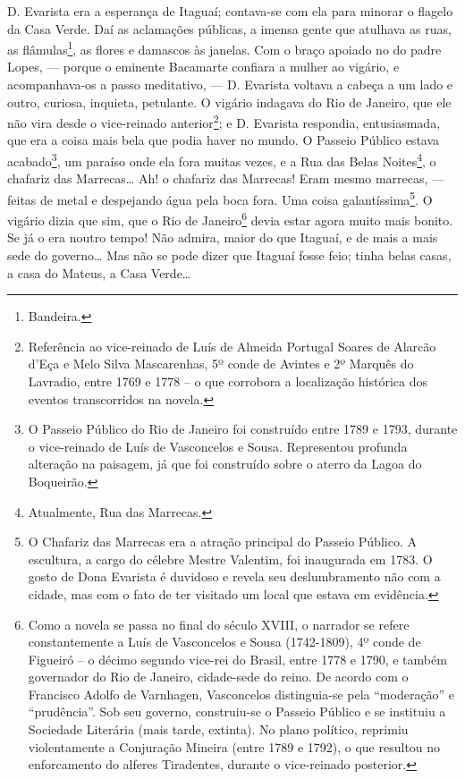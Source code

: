 D. Evarista era a esperança de Itaguaí; contava-se com ela para minorar
o flagelo da Casa Verde. Daí as aclamações públicas, a imensa gente que
atulhava as ruas, as flâmulas\footnote{Bandeira.}, as flores e damascos
às janelas. Com o braço apoiado no do padre Lopes, --- porque o eminente
Bacamarte confiara a mulher ao vigário, e acompanhava-os a passo
meditativo, --- D. Evarista voltava a cabeça a um lado e outro, curiosa,
inquieta, petulante. O vigário indagava do Rio de Janeiro, que ele não
vira desde o vice-reinado anterior\footnote{Referência ao vice-reinado
  de Luís de Almeida Portugal Soares de Alarcão d'Eça e Melo Silva
  Mascarenhas, 5º conde de Avintes e 2º Marquês do Lavradio, entre 1769
  e 1778 -- o que corrobora a localização histórica dos eventos
  transcorridos na novela.}; e D. Evarista respondia, entusiasmada, que
era a coisa mais bela que podia haver no mundo. O Passeio Público estava
acabado\footnote{O Passeio Público do Rio de Janeiro foi construído
  entre 1789 e 1793, durante o vice-reinado de Luís de Vasconcelos e
  Sousa. Representou profunda alteração na paisagem, já que foi
  construído sobre o aterro da Lagoa do Boqueirão.}, um paraíso onde ela
fora muitas vezes, e a Rua das Belas Noites\footnote{Atualmente, Rua das
  Marrecas.}, o chafariz das Marrecas\ldots{} Ah! o chafariz das
Marrecas! Eram mesmo marrecas, --- feitas de metal e despejando água
pela boca fora. Uma coisa galantíssima\footnote{O Chafariz das Marrecas
  era a atração principal do Passeio Público. A escultura, a cargo do
  célebre Mestre Valentim, foi inaugurada em 1783. O gosto de Dona
  Evarista é duvidoso e revela seu deslumbramento não com a cidade, mas
  com o fato de ter visitado um local que estava em evidência.}. O
vigário dizia que sim, que o Rio de Janeiro\footnote{Como a novela se
  passa no final do século XVIII, o narrador se refere constantemente a
  Luís de Vasconcelos e Sousa (1742-1809), 4º conde de Figueiró -- o
  décimo segundo vice-rei do Brasil, entre 1778 e 1790, e também
  governador do Rio de Janeiro, cidade-sede do reino. De acordo com o
  Francisco Adolfo de Varnhagen, Vasconcelos distinguia-se pela
  ``moderação'' e ``prudência''. Sob seu governo, construiu-se o Passeio
  Público e se instituiu a Sociedade Literária (mais tarde, extinta). No
  plano político, reprimiu violentamente a Conjuração Mineira (entre
  1789 e 1792), o que resultou no enforcamento do alferes Tiradentes,
  durante o vice-reinado posterior.} devia estar agora muito mais
bonito. Se já o era noutro tempo! Não admira, maior do que Itaguaí, e de
mais a mais sede do governo\ldots{} Mas não se pode dizer que Itaguaí
fosse feio; tinha belas casas, a casa do Mateus, a Casa Verde\ldots{}

